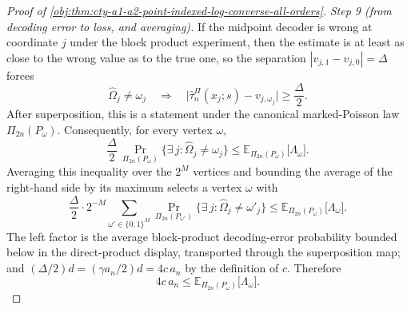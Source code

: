\begin{proof}[Proof of \cref{obj:thm:cty-a1-a2-point-indexed-log-converse-all-orders}]
\emph{Step 9 (from decoding error to loss, and averaging).}
If the midpoint decoder is wrong at coordinate \(j\) under the block product
experiment, then the estimate is at least as close to the wrong value as to the
true one, so the separation \(|v_{j,1}-v_{j,0}|=\Delta\) forces
\[
\widehat\Omega_j\neq\omega_j
\quad\Longrightarrow\quad
\bigl|\widehat\tau^{\Pi}_n(x_j;s)-v_{j,\omega_j}\bigr|\geq\frac{\Delta}{2}.
\]
After superposition, this is a statement under the canonical marked-Poisson law
\(\Pi_{2n}(P_\omega)\).  Consequently, for every vertex \(\omega\),
\[
\frac{\Delta}{2}\,
\Pr_{\Pi_{2n}(P_\omega)}\bigl\{\exists\,j:\widehat\Omega_j\neq\omega_j\bigr\}
\leq
\mathbb E_{\Pi_{2n}(P_\omega)}\bigl[\Lambda_\omega\bigr].
\]
Averaging this inequality over the \(2^M\) vertices and bounding the average of
the right-hand side by its maximum selects a vertex \(\omega\) with
\[
\frac{\Delta}{2}\cdot
2^{-M}\sum_{\omega'\in\{0,1\}^M}
\Pr_{\Pi_{2n}(P_{\omega'})}\bigl\{\exists\,j:\widehat\Omega_j\neq\omega'_j\bigr\}
\leq
\mathbb E_{\Pi_{2n}(P_\omega)}\bigl[\Lambda_\omega\bigr].
\]
The left factor is the average block-product decoding-error probability bounded
below in the direct-product display, transported through the superposition map;
and \((\Delta/2)d=(\gamma a_n/2)d=4c\,a_n\) by the definition of \(c\).  Therefore
\[
4c\,a_n\leq\mathbb E_{\Pi_{2n}(P_\omega)}\bigl[\Lambda_\omega\bigr].
\]


\end{proof}
